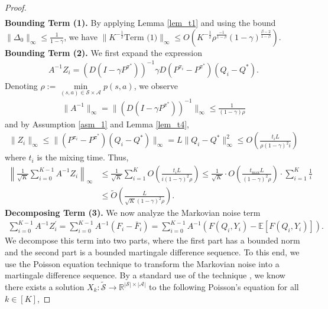 \documentclass{opt2025} %
\begin{document}
\begin{proof}
\begin{align}
\end{align}
\textbf{Bounding Term (1).} By applying Lemma \ref{lem_t1} and using the bound $\| \Delta_0 \|_{\infty} \leq \frac{1}{1-\gamma}$, we have $\| K^{-\frac{1}{2}} \text{Term (1)} \|_{\infty} \leq O\left( K^{-\frac{1}{2}} \rho^{\frac{-1}{1-\beta}}(1-\gamma)^{\frac{\beta-2}{1-\beta}} \right)$.\\
\textbf{Bounding Term (2).} We first expand the expression
\begin{align*}
A^{-1}Z_i = (D(I-\gamma P^{\pi^*}))^{-1}\gamma D(P^{\pi_i}-P^{\pi^*} )(Q_i-Q^*).
\end{align*}
Denoting $\rho:=\underset{(s,a)\in\mathcal{S}\times \mathcal{A}}{\min} p(s,a)$, we observe
\begin{align}
\|A^{-1}\|_{\infty} = \|(D(I-\gamma P^{\pi^*}))^{-1} \|_{\infty} \leq \frac{1}{(1-\gamma)\rho} \label{eqn_An1}
\end{align}
and by Assumption \ref{asm_1} and Lemma \ref{lem_t4},
\begin{align}
\| Z_i \|_{\infty} \leq \|(P^{\pi_i}-P^{\pi^*} )(Q_i-Q^*)\|_{\infty} = L\|Q_i-Q^* \|^2_{\infty} \leq O\left(\frac{t_iL}{\rho(1-\gamma)^2 i}\right) \label{eqn_Zi}
\end{align}
where $t_i$ is the mixing time. Thus,
\begin{align*}
\left\| \frac{1}{\sqrt{K}} \sum_{i=0}^{K-1} A^{-1}Z_i \right\|_{\infty} &\leq \frac{1}{\sqrt{K}} \sum_{i=1}^{K} O\left( \frac{t_iL}{i(1-\gamma)^2\rho}\right) \leq \frac{1}{\sqrt{K}} \cdot O\left( \frac{t_{\max}L}{(1-\gamma)^2\rho}\right) \cdot \sum_{i=1}^{K} \frac{1}{i} \\
&\leq \tilde{O}\left( \frac{L}{\sqrt{K}(1-\gamma)^2\rho}\right).
\end{align*}
\textbf{Decomposing Term (3).} We now analyze the Markovian noise term 
\begin{align*}
\sum_{i=0}^{K-1} A^{-1} Z_i^{\prime} = \sum_{i=0}^{K-1} A^{-1} (F_i - \bar{F}_i) = \sum_{i=0}^{K-1} A^{-1} (F(Q_i, Y_i) - \mathbb{E}[F(Q_i, Y_i)]).
\end{align*}
We decompose this term into two parts, where the first part has a bounded norm and the second part is a bounded martingale difference sequence. To this end, we use the Poisson equation technique \citep{glynn1996liapounov, douc2018markov, makowski2002poisson, chen2020explicit} to transform the Markovian noise into a martingale difference sequence. By a standard use of the technique \citep{douc2018markov}, we know there exists a solution $X_{k}: \tilde{\mathcal{S}} \rightarrow \mathbb{R}^{|\mathcal{S}|\times|\mathcal{A}|}$ to the following Poisson’s equation for all $k\in [K]$,

\end{proof}
\end{document}
